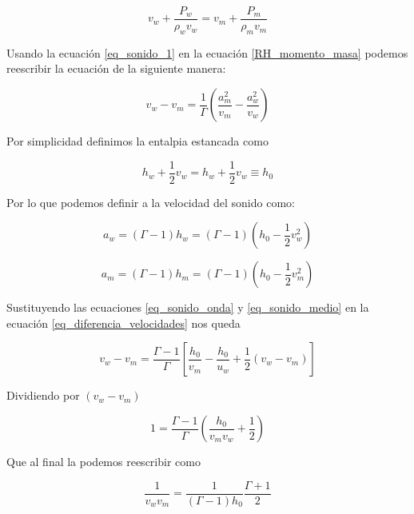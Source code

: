 \documentclass[12pt,a4paper]{book}
\begin{document}
\begin{equation} \label{RH_momento_masa}
  v_w + \frac{P_w}{\rho_w v_w} = v_m + \frac{P_m}{\rho_m v_m}
\end{equation}

Usando la ecuación \ref{eq_sonido_1} en la ecuación \ref{RH_momento_masa} podemos reescribir la ecuación de 
la siguiente manera:

\begin{equation} \label{eq_diferencia_velocidades}
  v_w-v_m = \frac{1}{\Gamma} \left(\frac{a_m^2}{v_m} - \frac{a_w^2}{v_w} \right)
\end{equation}

Por simplicidad definimos la entalpia estancada como 

\begin{equation}
  h_w + \frac{1}{2} v_w = h_w + \frac{1}{2} v_w \equiv h_0
\end{equation}

Por lo que podemos definir a la velocidad del sonido como:

\begin{equation} \label{eq_sonido_onda}
  a_w = \left( \Gamma-1 \right) h_w = \left( \Gamma-1 \right) \left( h_0 -\frac{1}{2} v_w^2 \right)
\end{equation}

\begin{equation} \label{eq_sonido_medio}
  a_m = \left( \Gamma-1 \right) h_m = \left( \Gamma-1 \right) \left( h_0 -\frac{1}{2} v_m^2 \right)
\end{equation}

Sustituyendo las ecuaciones \ref{eq_sonido_onda} y \ref{eq_sonido_medio} en la ecuación \ref{eq_diferencia_velocidades}
nos queda

\begin{equation}
  v_w-v_m = \frac{\Gamma - 1}{\Gamma} \left[ \frac{h_0}{v_m} - \frac{h_0}{u_w} + \frac{1}{2} \left( v_w - v_m\right) \right]
\end{equation}

Dividiendo por $ \left( v_w - v_m \right)$

\begin{equation}
  1 = \frac{\Gamma - 1}{\Gamma} \left( \frac{h_0}{v_m v_w} + \frac{1}{2} \right)
\end{equation}

Que al final la podemos reescribir como

\begin{equation} \label{eq_denominador}
  \frac{1}{v_w v_m} = \frac{1}{\left( \Gamma -1\right) h_0} \frac{\Gamma + 1}{2}
\end{equation}
\end{document}
